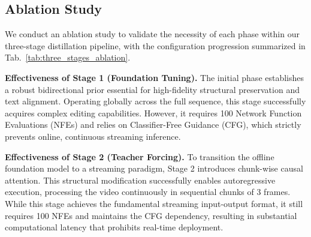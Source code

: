 \documentclass{llmxive}
\begin{document}
\subsection{Ablation Study}
\label{subsec:ablation_study}


\begin{table}[t]
    \centering
\caption{\textbf{Quantitative results of the cache-mechanism ablation.} Comparing the performance of applying the caching mechanism to either Self-Attention or FFN layers. \textbf{Red} denote the best results.}
\label{tab:ablation_cache}
\end{table}





We conduct an ablation study to validate the necessity of each phase within our three-stage distillation pipeline, with the configuration progression summarized in Tab.~\ref{tab:three_stages_ablation}.

\noindent \textbf{Effectiveness of Stage 1 (Foundation Tuning).} The initial phase establishes a robust bidirectional prior essential for high-fidelity structural preservation and text alignment. Operating globally across the full sequence, this stage successfully acquires complex editing capabilities. However, it requires 100 Network Function Evaluations (NFEs) and relies on Classifier-Free Guidance (CFG), which strictly prevents online, continuous streaming inference. 

\noindent \textbf{Effectiveness of Stage 2 (Teacher Forcing).} To transition the offline foundation model to a streaming paradigm, Stage 2 introduces chunk-wise causal attention. This structural modification successfully enables autoregressive execution, processing the video continuously in sequential chunks of 3 frames. While this stage achieves the fundamental streaming input-output format, it still requires 100 NFEs and maintains the CFG dependency, resulting in substantial computational latency that prohibits real-time deployment. 
\end{document}
